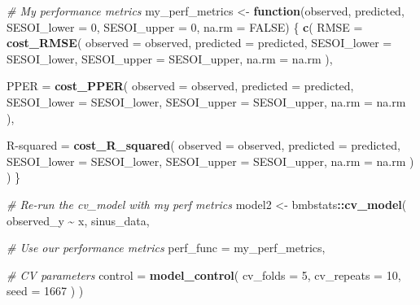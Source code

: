 \documentclass[
]{book}
\newenvironment{Shaded}{\begin{snugshade}}{\end{snugshade}}
\newcommand{\CommentTok}[1]{\textcolor[rgb]{0.56,0.35,0.01}{\textit{#1}}}
\newcommand{\ControlFlowTok}[1]{\textcolor[rgb]{0.13,0.29,0.53}{\textbf{#1}}}
\newcommand{\DataTypeTok}[1]{\textcolor[rgb]{0.13,0.29,0.53}{#1}}
\newcommand{\DecValTok}[1]{\textcolor[rgb]{0.00,0.00,0.81}{#1}}
\newcommand{\KeywordTok}[1]{\textcolor[rgb]{0.13,0.29,0.53}{\textbf{#1}}}
\newcommand{\NormalTok}[1]{#1}
\newcommand{\OperatorTok}[1]{\textcolor[rgb]{0.81,0.36,0.00}{\textbf{#1}}}
\newcommand{\OtherTok}[1]{\textcolor[rgb]{0.56,0.35,0.01}{#1}}
\newcommand{\StringTok}[1]{\textcolor[rgb]{0.31,0.60,0.02}{#1}}
\begin{document}
\begin{Shaded}
\begin{Highlighting}[]
\CommentTok{\# My performance metrics}
\NormalTok{my\_perf\_metrics <{-}}\StringTok{ }\ControlFlowTok{function}\NormalTok{(observed,}
\NormalTok{                            predicted,}
                            \DataTypeTok{SESOI\_lower =} \DecValTok{0}\NormalTok{,}
                            \DataTypeTok{SESOI\_upper =} \DecValTok{0}\NormalTok{,}
                            \DataTypeTok{na.rm =} \OtherTok{FALSE}\NormalTok{) \{}
  \KeywordTok{c}\NormalTok{(}
    \DataTypeTok{RMSE =} \KeywordTok{cost\_RMSE}\NormalTok{(}
      \DataTypeTok{observed =}\NormalTok{ observed,}
      \DataTypeTok{predicted =}\NormalTok{ predicted,}
      \DataTypeTok{SESOI\_lower =}\NormalTok{ SESOI\_lower,}
      \DataTypeTok{SESOI\_upper =}\NormalTok{ SESOI\_upper,}
      \DataTypeTok{na.rm =}\NormalTok{ na.rm}
\NormalTok{    ),}

    \DataTypeTok{PPER =} \KeywordTok{cost\_PPER}\NormalTok{(}
      \DataTypeTok{observed =}\NormalTok{ observed,}
      \DataTypeTok{predicted =}\NormalTok{ predicted,}
      \DataTypeTok{SESOI\_lower =}\NormalTok{ SESOI\_lower,}
      \DataTypeTok{SESOI\_upper =}\NormalTok{ SESOI\_upper,}
      \DataTypeTok{na.rm =}\NormalTok{ na.rm}
\NormalTok{    ),}

    \StringTok{\textasciigrave{}}\DataTypeTok{R{-}squared}\StringTok{\textasciigrave{}}\NormalTok{ =}\StringTok{ }\KeywordTok{cost\_R\_squared}\NormalTok{(}
      \DataTypeTok{observed =}\NormalTok{ observed,}
      \DataTypeTok{predicted =}\NormalTok{ predicted,}
      \DataTypeTok{SESOI\_lower =}\NormalTok{ SESOI\_lower,}
      \DataTypeTok{SESOI\_upper =}\NormalTok{ SESOI\_upper,}
      \DataTypeTok{na.rm =}\NormalTok{ na.rm}
\NormalTok{    )}
\NormalTok{  )}
\NormalTok{\}}


\CommentTok{\# Re{-}run the cv\_model with my perf metrics}
\NormalTok{model2 <{-}}\StringTok{ }\NormalTok{bmbstats}\OperatorTok{::}\KeywordTok{cv\_model}\NormalTok{(}
\NormalTok{  observed\_y }\OperatorTok{\textasciitilde{}}\StringTok{ }\NormalTok{x,}
\NormalTok{  sinus\_data,}

  \CommentTok{\# Use our performance metrics}
  \DataTypeTok{perf\_func =}\NormalTok{ my\_perf\_metrics,}

  \CommentTok{\# CV parameters}
  \DataTypeTok{control =} \KeywordTok{model\_control}\NormalTok{(}
    \DataTypeTok{cv\_folds =} \DecValTok{5}\NormalTok{,}
    \DataTypeTok{cv\_repeats =} \DecValTok{10}\NormalTok{,}
    \DataTypeTok{seed =} \DecValTok{1667}
\NormalTok{  )}
\NormalTok{)}


\end{Highlighting}
\end{Shaded}
\end{document}
